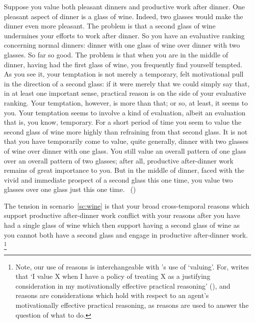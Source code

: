 \documentclass[10pt]{article}
\begin{document}
\begin{scenario}[Wine]\label{sc:wine}
  Suppose you value both pleasant dinners and productive work after dinner.
  One pleasant aspect of dinner is a glass of wine.
  Indeed, two glasses would make the dinner even more pleasant.
  The problem is that a second glass of wine undermines your efforts to work after dinner.
  So you have an evaluative ranking concerning normal dinners: dinner with one glass of wine over dinner with two glasses.
  So far so good. The problem is that when you are in the middle of dinner, having had the first glass of wine, you frequently find yourself tempted.
  As you see it, your temptation is not merely a temporary, felt motivational pull in the direction of a second glass: if it were merely that we could simply say that, in at least one important sense, practical reason is on the side of your evaluative ranking.
  Your temptation, however, is more than that; or so, at least, it seems to you.
  Your temptation seems to involve a kind of evaluation, albeit an evaluation that is, you know, temporary.
  For a short period of time you seem to value the second glass of wine more highly than refraining from that second glass.
  It is not that you have temporarily come to value, quite generally, dinner with two glasses of wine over dinner with one glass.
  You still value an overall pattern of one glass over an overall pattern of two glasses; after all, productive after-dinner work remains of great importance to you.
  But in the middle of dinner, faced with the vivid and immediate prospect of a second glass this one time, you value two glasses over one glass just this one time.\nolinebreak
  \mbox{ }\hfill(\citeyear[257]{Bratman:2007ab})
\end{scenario}

The tension in scenario~\ref{sc:wine} is that your broad cross-temporal reasons which support productive after-dinner work conflict with your reasons after you have had a single glass of wine which then support having a second glass of wine as you cannot both have a second glass and engage in productive after-dinner work.\nolinebreak
\footnote{Note, our use of reasons is interchangeable with \citeauthor{Bratman:2007ab}'s use of `valuing'.
  For, \citeauthor{Bratman:2007ab} writes that  `I value X when I have a policy of treating X as a justifying consideration in my motivationally effective practical reasoning' (\citeyear[269]{Bratman:2007ab}), and reasons are considerations which hold with respect to an agent's motivationally effective practical reasoning, as reasons are used to answer the question of what to do.}
\end{document}
